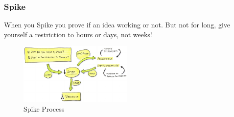 \subsubsection{Spike}
When you Spike you prove if an idea working or not. But not for long, give yourself a restriction to hours or days, not weeks!
\begin{figure}[H]
\centering
\includegraphics[width=0.5\textwidth]{figures/Spike.PNG}
\caption{Spike Process}
\end{figure}



\clearpage